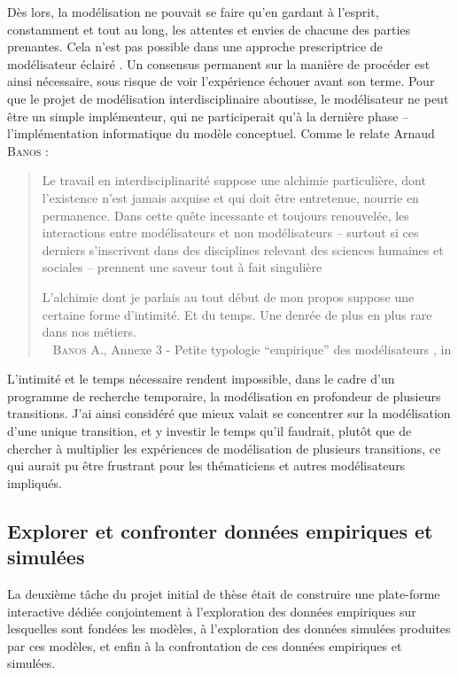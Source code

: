Dès lors, la modélisation ne pouvait se faire qu'en gardant à l'esprit, constamment et tout au long, les attentes et envies de chacune des parties prenantes.
Cela n'est pas possible dans une approche prescriptrice de \og modélisateur éclairé\fg{} \autocite[484]{ouriachi_lelaboration_2017}.
Un consensus permanent sur la manière de procéder est ainsi nécessaire, sous risque de voir l'expérience échouer avant son terme.
Pour que le projet de modélisation interdisciplinaire aboutisse, le modélisateur ne peut être un simple \og implémenteur\fg{}, qui ne participerait qu'à la dernière phase -- l'implémentation informatique du modèle conceptuel.
Comme le relate Arnaud \textsc{Banos} :
\begin{quotation}
	\noindent \og
	Le travail en interdisciplinarité suppose une alchimie particulière, dont l'existence n'est jamais acquise et qui doit être entretenue, nourrie en permanence.
	Dans cette quête incessante et toujours renouvelée, les interactions entre modélisateurs et non modélisateurs -- surtout si ces derniers s'inscrivent dans des disciplines relevant des sciences humaines et sociales -- prennent une saveur tout à fait singulière \textelp{}
	
	\noindent L'alchimie dont je parlais au tout début de mon propos suppose une certaine forme d'intimité.
	Et du temps.
	Une denrée de plus en plus rare dans nos métiers. \fg{} \\
	\mbox{}~ \textsc{Banos} A., \og Annexe 3 - Petite typologie “empirique” des modélisateurs \fg{}, in \textcite[483,485]{ouriachi_lelaboration_2017}
\end{quotation}
L'\og intimité\fg{} et le temps nécessaire rendent impossible, dans le cadre d'un programme de recherche temporaire, la modélisation en profondeur de plusieurs transitions.
J'ai ainsi considéré que mieux valait se concentrer sur la modélisation d'une unique transition, et y investir le temps qu'il faudrait, plutôt que de chercher à multiplier les expériences de modélisation de plusieurs transitions, ce qui aurait pu être frustrant pour les thématiciens et autres modélisateurs impliqués.


\subsection{Explorer et confronter données empiriques et simulées}

La deuxième tâche du projet initial de thèse était de construire une plate-forme interactive dédiée conjointement à l'exploration des données empiriques sur lesquelles sont fondées les modèles, à l'exploration des données simulées produites par ces modèles, et enfin à la confrontation de ces données empiriques et simulées.

